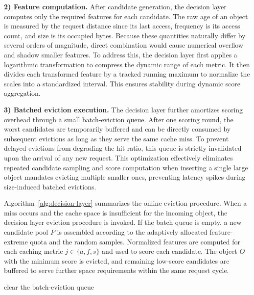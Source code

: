 \documentclass[10pt,journal]{IEEEtran}
\theoremstyle{slantedlemma}
\begin{document}
\textbf{2) Feature computation.} After candidate generation, the decision layer computes only the required features for each candidate. The raw age of an object is measured by the request distance since its last access, frequency is its access count, and size is its occupied bytes. Because these quantities naturally differ by several orders of magnitude, direct combination would cause numerical overflow and shadow smaller features. To address this, the decision layer first applies a logarithmic transformation to compress the dynamic range of each metric. It then divides each transformed feature by a tracked running maximum to normalize the scales into a standardized interval. This  ensures stability during dynamic score aggregation.

\textbf{3) Batched eviction execution.} The decision layer further amortizes scoring overhead through a small batch-eviction queue. After one scoring round, the worst candidates are temporarily buffered and can be directly consumed by subsequent evictions as long as they serve the same cache miss. To prevent delayed evictions from degrading the hit ratio, this queue is strictly invalidated upon the arrival of any new request. This optimization effectively eliminates repeated candidate sampling and score computation when inserting a single large object mandates evicting multiple smaller ones, preventing latency spikes during size-induced batched evictions.

Algorithm~\ref{alg:decision-layer} summarizes the online eviction procedure. When a miss occurs and the cache space is insufficient for the incoming object, the decision layer eviction procedure is invoked. If the batch queue is empty, a new candidate pool $P$ is assembled according to the adaptively allocated feature-extreme quota and the random samples. Normalized features are computed for each caching metric $j \in \{a,f,s\}$ and used to score each candidate. The object $O$ with the minimum score is evicted, and remaining low-score candidates are buffered to serve further space requirements within the same request cycle.

\begin{algorithm}[t]
	\caption{Decision-layer eviction procedure.}
	\label{alg:decision-layer}
	\SetAlgoLined
	clear the batch-eviction queue\;
\end{algorithm}
\end{document}
